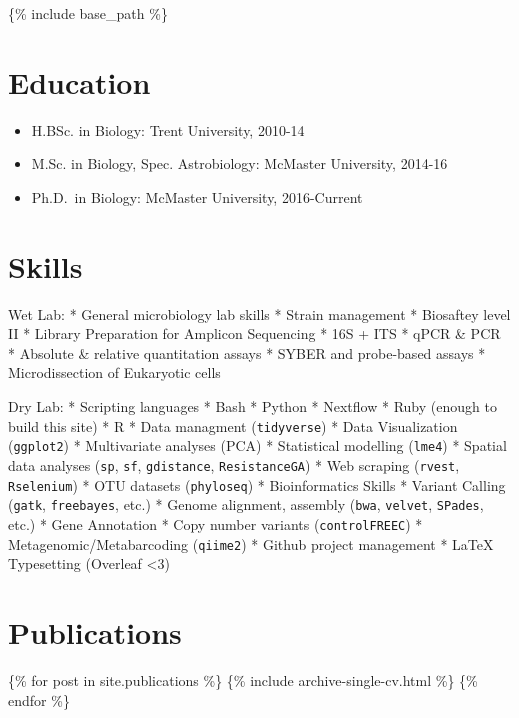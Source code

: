 \{\% include base\_path \%\}

\hypertarget{education}{%
\section{Education}\label{education}}

\begin{itemize}
\tightlist
\item
  H.BSc. in Biology: Trent University, 2010-14
\item
  M.Sc. in Biology, Spec. Astrobiology: McMaster University, 2014-16
\item
  Ph.D.~in Biology: McMaster University, 2016-Current
\end{itemize}

\hypertarget{skills}{%
\section{Skills}\label{skills}}

Wet Lab: * General microbiology lab skills * Strain management *
Biosaftey level II * Library Preparation for Amplicon Sequencing * 16S +
ITS * qPCR \& PCR * Absolute \& relative quantitation assays * SYBER and
probe-based assays * Microdissection of Eukaryotic cells

Dry Lab: * Scripting languages * Bash * Python * Nextflow * Ruby (enough
to build this site) * R * Data managment (\texttt{tidyverse}) * Data
Visualization (\texttt{ggplot2}) * Multivariate analyses (PCA) *
Statistical modelling (\texttt{lme4}) * Spatial data analyses
(\texttt{sp}, \texttt{sf}, \texttt{gdistance}, \texttt{ResistanceGA}) *
Web scraping (\texttt{rvest}, \texttt{Rselenium}) * OTU datasets
(\texttt{phyloseq}) * Bioinformatics Skills * Variant Calling
(\texttt{gatk}, \texttt{freebayes}, etc.) * Genome alignment, assembly
(\texttt{bwa}, \texttt{velvet}, \texttt{SPades}, etc.) * Gene Annotation
* Copy number variants (\texttt{controlFREEC}) *
Metagenomic/Metabarcoding (\texttt{qiime2}) * Github project management
* LaTeX Typesetting (Overleaf \textless{}3)

\hypertarget{publications}{%
\section{Publications}\label{publications}}

\{\% for post in site.publications \%\} \{\% include
archive-single-cv.html \%\} \{\% endfor \%\}

